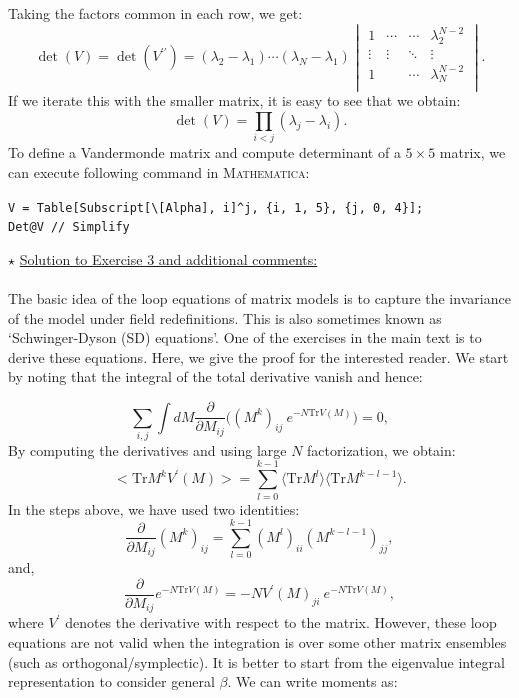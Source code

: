 \documentclass[letter,11pt]{article}
\newcommand{\MA}{\textsc{Mathematica}}
\begin{document}
Taking the factors common in each row, we get:
\begin{equation}
	\det(V) = \det(V^{\prime\prime}) = 
	(\lambda_2 - \lambda_1) \cdots (\lambda_N - \lambda_1)
	\begin{vmatrix}
		1 & \cdots & \cdots & \lambda_2^{N-2} \\ 
		\vdots  & \vdots  & \ddots & \vdots  \\
		1 &  & \cdots &  \lambda_N^{N-2} \\
	\end{vmatrix}.
\end{equation}
If we iterate this with the smaller matrix, it is easy to see that we obtain:
\begin{equation}
	\det(V) = \prod_{i<j} (\lambda_j - \lambda_i).
\end{equation}
To define a Vandermonde matrix and compute determinant of a $ 5 \times 5$ matrix, we can execute following command in \MA:
\begin{mdframed}[backgroundcolor=magenta!2]
	\begin{footnotesize} 
		\verb"V = Table[Subscript[\[Alpha], i]^j, {i, 1, 5}, {j, 0, 4}];"\\ 
		\verb"Det@V // Simplify"
	\end{footnotesize} 
\end{mdframed}

\noindent \noindent $\star$ \ul{Solution to Exercise 3 and additional comments:} 
\\ \\ 
The basic idea of the loop equations of matrix models is to capture the invariance of the model under field redefinitions. This is also sometimes known as `Schwinger-Dyson (SD) equations'. One of the exercises in the main text is to derive these equations. Here, we give the proof for the interested reader. We start by noting that the integral of the total derivative vanish and hence:

\begin{equation}
	\sum_{i,j} \int dM \frac{\partial}{\partial M_{ij}} \Bigg( (M^k)_{ij}~e^{-N\mathrm{Tr} V(M)}\Bigg) = 0, 
\end{equation}
By computing the derivatives and using large $N$ factorization, we obtain:
\begin{equation}
	\Big< \mathrm{Tr} M^{k} V^{\prime}(M) \Big> = \sum_{l=0}^{k-1} \langle \mathrm{Tr} M^{l} \rangle  \langle \mathrm{Tr} M^{k-l-1} \rangle. 
\end{equation}
In the steps above, we have used two identities:
\begin{equation}
	\frac{\partial}{\partial M_{ij}} (M^{k})_{ij} = \sum_{l=0}^{k-1} (M^{l})_{ii} (M^{k-l-1})_{jj},
\end{equation}
and, 
\begin{equation}
	\frac{\partial}{\partial M_{ij}} e^{-N\mathrm{Tr} V(M)} = -N V^{\prime}(M)_{ji}~e^{-N\mathrm{Tr} V(M)},
\end{equation}
where $V^{\prime}$ denotes the derivative with respect to the matrix. 
However, these loop equations are not valid when the integration is over some other matrix ensembles (such as orthogonal/symplectic). It is better to start from the eigenvalue integral representation to consider general $\beta$. We can write moments as:
\end{document}

